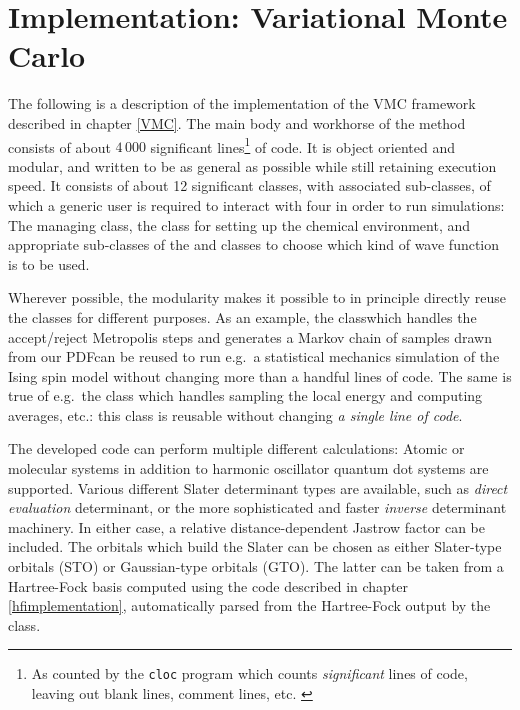 \documentclass[../../master.tex]{subfiles}
\begin{document}
\chapter{Implementation: Variational Monte Carlo}
The following is a description of the implementation of the VMC framework described in chapter \ref{VMC}. The main body and workhorse of the method consists of about $4\,000$ significant lines\footnote{As counted by the \lstinline{cloc} program which counts \emph{significant} lines of code, leaving out blank lines, comment lines, etc. \cite{cloc}} of \CC{}  code. It is object oriented and modular, and written to be as general as possible while still retaining execution speed. It consists of about 12 significant classes, with associated sub-classes, of which a generic user is required to interact with four in order to run simulations: The managing  class, the  class for setting up the chemical environment, and appropriate sub-classes of the  and  classes to choose which kind of wave function is to be used.

Wherever possible, the modularity makes it possible to in principle directly reuse the classes for different purposes. As an example, the  class\textemdash which handles the accept/reject Metropolis steps and generates a Markov chain of samples drawn from our PDF\textemdash can be reused to run e.g.\ a statistical mechanics simulation of the Ising spin model without changing more than a handful lines of code. The same is true of e.g.\ the  class which handles sampling the local energy and computing averages, etc.: this class is reusable without changing \emph{a single line of code}.

The developed code can perform multiple different calculations: Atomic or molecular systems in addition to harmonic oscillator quantum dot systems are supported. Various different Slater determinant types are available, such as \emph{direct evaluation} determinant, or the more sophisticated and faster \emph{inverse} determinant machinery. In either case, a relative distance-dependent Jastrow factor can be included. The orbitals which build the Slater can be chosen as either Slater-type orbitals (STO) or Gaussian-type orbitals (GTO). The latter can be taken from a Hartree-Fock basis computed using the code described in chapter \ref{hfimplementation}, automatically parsed from the Hartree-Fock output by the  class. 
\end{document}
